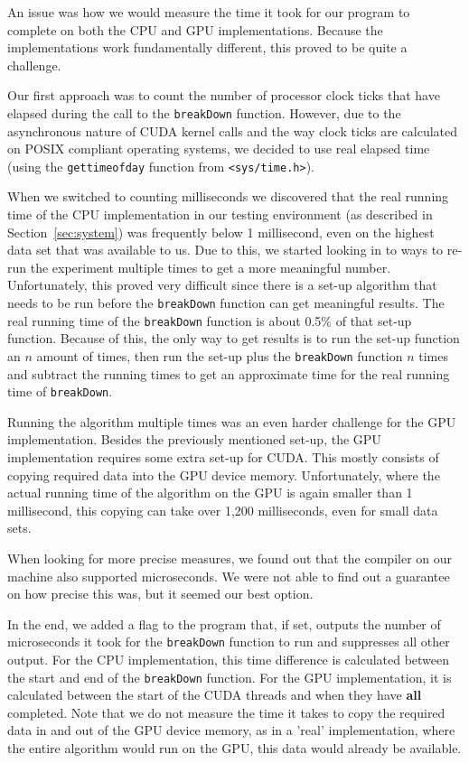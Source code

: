 An issue was how we would measure the time it took for our program to complete on both the CPU and GPU implementations.
Because the implementations work fundamentally different, this proved to be quite a challenge.

Our first approach was to count the number of processor clock ticks that have elapsed during the call to the \texttt{breakDown} function.
However, due to the asynchronous nature of CUDA kernel calls and the way clock ticks are calculated on POSIX compliant operating systems, we decided to use real elapsed time (using the \texttt{gettimeofday} function from \texttt{<sys/time.h>}).

When we switched to counting milliseconds we discovered that the real running time of the CPU implementation in our testing environment (as described in Section~\ref{sec:system}) was frequently below 1 millisecond, even on the highest data set that was available to us.
Due to this, we started looking in to ways to re-run the experiment multiple times to get a more meaningful number.
Unfortunately, this proved very difficult since there is a set-up algorithm that needs to be run before the \texttt{breakDown} function can get meaningful results.
The real running time of the \texttt{breakDown} function is about 0.5\% of that set-up function.
Because of this, the only way to get results is to run the set-up function an $n$ amount of times, then run the set-up plus the \texttt{breakDown} function $n$ times and subtract the running times to get an approximate time for the real running time of \texttt{breakDown}.

Running the algorithm multiple times was an even harder challenge for the GPU implementation.
Besides the previously mentioned set-up, the GPU implementation requires some extra set-up for CUDA.
This mostly consists of copying required data into the GPU device memory.
Unfortunately, where the actual running time of the algorithm on the GPU is again smaller than 1 millisecond, this copying can take over 1,200 milliseconds, even for small data sets.

When looking for more precise measures, we found out that the compiler on our machine also supported microseconds.
We were not able to find out a guarantee on how precise this was, but it seemed our best option.

In the end, we added a flag to the program that, if set, outputs the number of microseconds it took for the \texttt{breakDown} function to run and suppresses all other output.
For the CPU implementation, this time difference is calculated between the start and end of the \texttt{breakDown} function.
For the GPU implementation, it is calculated between the start of the CUDA threads and when they have \textbf{all} completed.
Note that we do not measure the time it takes to copy the required data in and out of the GPU device memory, as in a 'real' implementation, where the entire algorithm would run on the GPU, this data would already be available.


